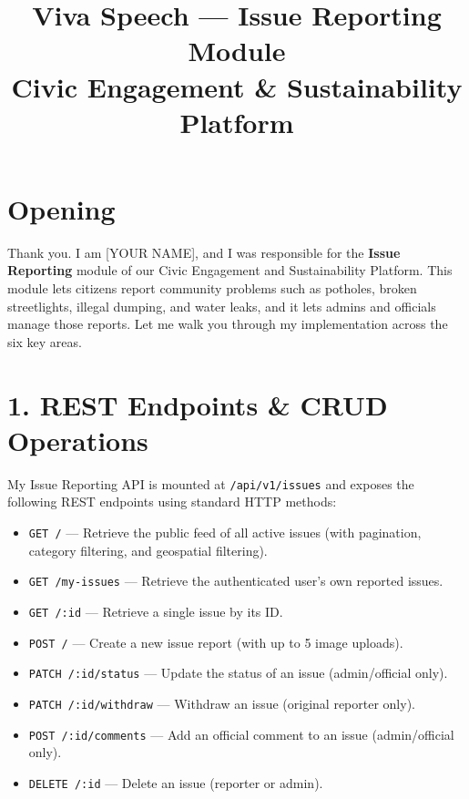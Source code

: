 \documentclass[12pt,a4paper]{article}
\title{\textbf{Viva Speech --- Issue Reporting Module}\\[4pt]
\large Civic Engagement \& Sustainability Platform}
\author{}
\date{}
\begin{document}
\maketitle
\thispagestyle{empty}


\section*{Opening}

Thank you. I am [YOUR NAME], and I was responsible for the \textbf{Issue Reporting} module of our Civic Engagement and Sustainability Platform. This module lets citizens report community problems such as potholes, broken streetlights, illegal dumping, and water leaks, and it lets admins and officials manage those reports. Let me walk you through my implementation across the six key areas.

\section{1. REST Endpoints \& CRUD Operations}

My Issue Reporting API is mounted at \texttt{/api/v1/issues} and exposes the following REST endpoints using standard HTTP methods:

\begin{itemize}[nosep]
    \item \texttt{GET /} --- Retrieve the public feed of all active issues (with pagination, category filtering, and geospatial filtering).
    \item \texttt{GET /my-issues} --- Retrieve the authenticated user's own reported issues.
    \item \texttt{GET /:id} --- Retrieve a single issue by its ID.
    \item \texttt{POST /} --- Create a new issue report (with up to 5 image uploads).
    \item \texttt{PATCH /:id/status} --- Update the status of an issue (admin/official only).
    \item \texttt{PATCH /:id/withdraw} --- Withdraw an issue (original reporter only).
    \item \texttt{POST /:id/comments} --- Add an official comment to an issue (admin/official only).
    \item \texttt{DELETE /:id} --- Delete an issue (reporter or admin).
\end{itemize}
\end{document}
